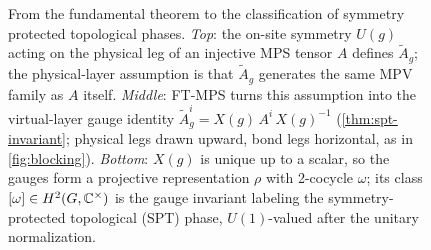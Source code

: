 \begin{figure}[t]
    \caption{From the fundamental theorem to the classification of symmetry protected topological phases.
        \emph{Top}: the on-site symmetry $U(g)$ acting on the physical leg of
        an injective MPS tensor $A$ defines $\tilde A_g$; the physical-layer
        assumption is that $\tilde A_g$ generates the same MPV family as $A$
        itself.
        \emph{Middle}: FT-MPS turns this assumption into the virtual-layer
        gauge identity $\tilde A_g^i = X(g)\,A^i\,{X(g)}^{-1}$
        (\cref{thm:spt-invariant}; physical legs drawn upward, bond legs
        horizontal, as in \cref{fig:blocking}).
        \emph{Bottom}: $X(g)$ is unique up to a scalar, so the gauges form a
        projective representation $\rho$ with 2-cocycle $\omega$; its class
        $[\omega]\in H^2(G,\mathbb{C}^\times)$ is the gauge invariant labeling the
        symmetry-protected topological (SPT) phase, $U(1)$-valued after the
        unitary normalization.
        }\label{fig:spt}
\end{figure}

